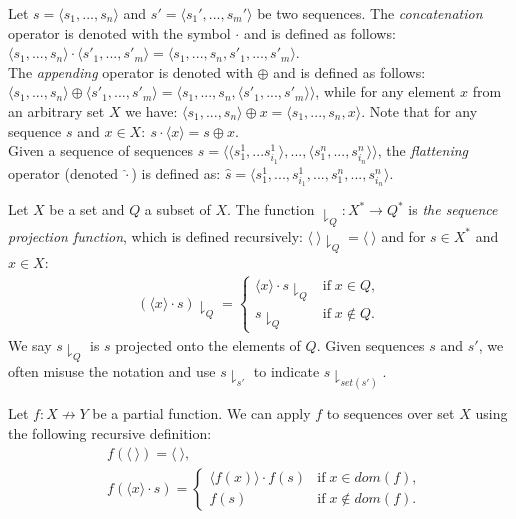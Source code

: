 \begin{definition}
Let $s=\langle s_1,...,s_n \rangle$ and $s'=\langle s_1',...,s_m' \rangle$ be two sequences.
The \emph{concatenation} operator is denoted with the symbol $\cdot$ and is defined as follows: 
$\langle s_1,...,s_n \rangle \cdot \langle s'_1,...,s'_m \rangle = \langle s_1,...,s_n,s'_1,...,s'_m \rangle$. \\
The \emph{appending} operator is denoted with $\oplus$ and is defined as follows:
$\langle s_1,...,s_n \rangle \oplus \langle s'_1,...,s'_m \rangle = \langle s_1,...,s_n, \langle s'_1,...,s'_m \rangle \rangle$, while for any element $x$ from an arbitrary set $X$ we have:
$\langle s_1,...,s_n \rangle \oplus x = \langle s_1,...,s_n,x \rangle$.
Note that for any sequence $s$ and $x \in X: ~ s \cdot \langle x \rangle = s \oplus x$.\\
Given a sequence of sequences $s = \langle \langle s^1_1,...s^1_{i_1} \rangle,..., \langle s^n_1,...,s^n_{i_n}\rangle \rangle$, the \emph{flattening} operator (denoted  $\widehat{\cdot}$) is defined as: $\widehat{s} = \langle s^1_1,...,s^1_{i_1},...,s^n_1,...,s^n_{i_n}\rangle$.\\
\end{definition}


\begin{definition}
Let $X$ be a set and $Q$ a subset of $X$. The function $ \downharpoonright_Q: X^* \to Q^*$ is \emph{the sequence projection function}, which is defined recursively:
$\langle ~ \rangle \downharpoonright_Q = \langle ~ \rangle$ and for $s \in X^*$ and $x \in X$:
\begin{align*}
(\langle x \rangle \cdot s) \downharpoonright_Q = \begin{cases}
	 \langle x \rangle \cdot s \downharpoonright_Q & \mbox{if} \; x \in Q, \\
	s\downharpoonright_Q & \mbox{if} \; x \not \in Q.
	\end{cases} 
\end{align*}
We say $s \downharpoonright_Q$ is $s$ projected onto the elements of $Q$.
Given sequences $s$ and $s'$, we often misuse the notation and use $s \downharpoonright_{s'}$ to indicate $s \downharpoonright_{set(s')}$.
\end{definition}


\begin{definition}
Let $f: X \not \to Y$ be a partial function.
We can apply $f$ to sequences over set $X$ using the following recursive definition:
\begin{align*}
&f(\langle ~ \rangle) = \langle ~ \rangle, \\
&f(\langle x \rangle \cdot s)  = \begin{cases}
	 \langle f(x) \rangle \cdot f(s) & \mbox{if} \; x \in dom(f), \\
	f(s) & \mbox{if} \; x \not \in dom(f).
	\end{cases} 
\end{align*}

\end{definition}


